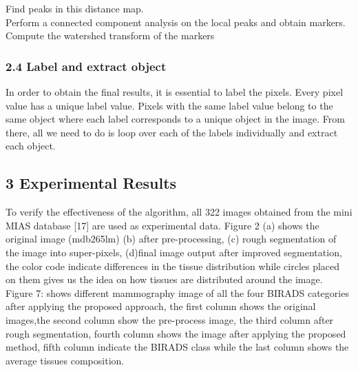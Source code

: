 \documentclass{article}
\begin{document}
\hspace*{4ex} Find peaks in this distance map.\\

\hspace*{4ex} Perform a connected component analysis on the local peaks and obtain \hspace*{8ex}markers.\\

\hspace*{4ex}  Compute the watershed transform of the markers

\subsubsection*{2.4 Label and extract object}In order to obtain the final results, it is essential to label the pixels. Every pixel value has a unique label value. Pixels with the same label value belong to the same object where each label corresponds to a unique object in the image. From there, all we need to do is loop over each of the labels individually and extract each object.

\newpage
\subsection*{3 Experimental Results}To verify the effectiveness of the algorithm, all 322 images obtained from the mini MIAS database [17] are used as experimental data. Figure 2 (a) shows the original image (mdb265lm) (b) after pre-processing, (c) rough segmentation of the image into super-pixels, (d)final image output after improved segmentation, the color code indicate differences in the tissue distribution while circles placed on them gives us the idea on how tissues are distributed around the image. Figure 7: shows different mammography image of all the four BIRADS categories after applying the proposed approach, the first column shows the original images,the second column show the pre-process image, the third column after rough segmentation, fourth column shows the image after applying the proposed method, fifth column indicate the BIRADS class while the last column shows the average tissues composition. 
\end{document}
